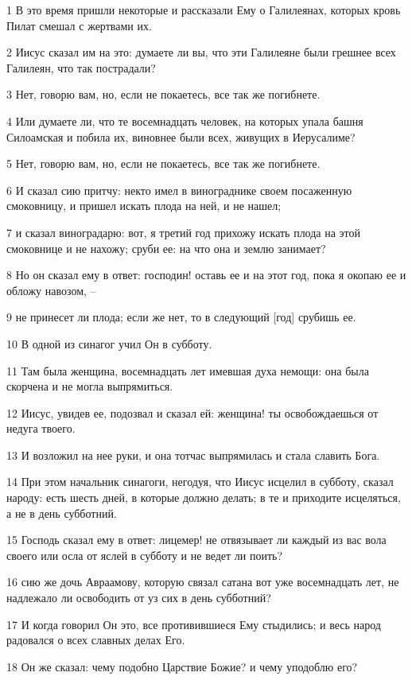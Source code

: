 \par 1 В это время пришли некоторые и рассказали Ему о Галилеянах, которых кровь Пилат смешал с жертвами их.
\par 2 Иисус сказал им на это: думаете ли вы, что эти Галилеяне были грешнее всех Галилеян, что так пострадали?
\par 3 Нет, говорю вам, но, если не покаетесь, все так же погибнете.
\par 4 Или думаете ли, что те восемнадцать человек, на которых упала башня Силоамская и побила их, виновнее были всех, живущих в Иерусалиме?
\par 5 Нет, говорю вам, но, если не покаетесь, все так же погибнете.
\par 6 И сказал сию притчу: некто имел в винограднике своем посаженную смоковницу, и пришел искать плода на ней, и не нашел;
\par 7 и сказал виноградарю: вот, я третий год прихожу искать плода на этой смоковнице и не нахожу; сруби ее: на что она и землю занимает?
\par 8 Но он сказал ему в ответ: господин! оставь ее и на этот год, пока я окопаю ее и обложу навозом, --
\par 9 не принесет ли плода; если же нет, то в следующий [год] срубишь ее.
\par 10 В одной из синагог учил Он в субботу.
\par 11 Там была женщина, восемнадцать лет имевшая духа немощи: она была скорчена и не могла выпрямиться.
\par 12 Иисус, увидев ее, подозвал и сказал ей: женщина! ты освобождаешься от недуга твоего.
\par 13 И возложил на нее руки, и она тотчас выпрямилась и стала славить Бога.
\par 14 При этом начальник синагоги, негодуя, что Иисус исцелил в субботу, сказал народу: есть шесть дней, в которые должно делать; в те и приходите исцеляться, а не в день субботний.
\par 15 Господь сказал ему в ответ: лицемер! не отвязывает ли каждый из вас вола своего или осла от яслей в субботу и не ведет ли поить?
\par 16 сию же дочь Авраамову, которую связал сатана вот уже восемнадцать лет, не надлежало ли освободить от уз сих в день субботний?
\par 17 И когда говорил Он это, все противившиеся Ему стыдились; и весь народ радовался о всех славных делах Его.
\par 18 Он же сказал: чему подобно Царствие Божие? и чему уподоблю его?
